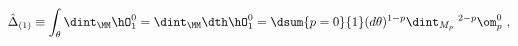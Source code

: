 \begin{equation}
\label{multi-int-1}
\hat{\Delta} _{(1)} \equiv 
\int_{\theta} \dint_{\MM} 
 \hO _1^0
= 
\dint_{\MM} 
\dth \hO _1^0
= \dsum{p=0}{1} (d\theta)^{1-p} 
  \dint_{M_p}\;^{2-p}  \om^0 _p \ ,
\end{equation}

